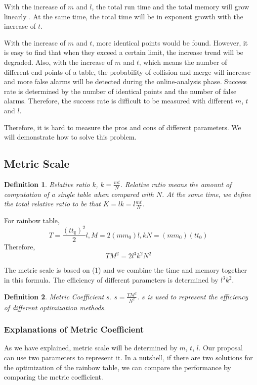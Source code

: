 \documentclass[runningheads,a4paper]{llncs}
\newtheorem{defn}{Definition}
\begin{document}
With the increase of $m$ and $l$, the total run time and the total memory will grow linearly \cite{il1999achieving}. At the same time, the total time will be in exponent growth with the increase of $t$.

With the increase of $m$ and $t$, more identical points would be found. However, it is easy to find that when they exceed a certain limit, the increase trend will be degraded. Also, with the increase of $m$ and $t$, which means the number of different end points of a table, the probability of collision and merge will increase and more false alarms will be detected during the online-analysis phase. Success rate is determined by the number of identical points and the number of false alarms. Therefore, the success rate is difficult to be measured with different $m$, $t$ and $l$.

Therefore, it is hard to measure the pros and cons of different parameters. We will demonstrate how to solve this problem.

\subsection{Metric Scale}

\begin{defn}Relative ratio $k$, $k = \frac{mt}{N}$. Relative ratio means the amount of computation of a single table when compared with $N$. At the same time, we define the total relative ratio to be that $K = lk = l \frac{mt}{N}$.\end{defn}

For rainbow table, 
$$T = \frac{(t t_0)^2}{2} l , M = 2 (m m_0) l, k N = (m m_0) (t t_0)$$
Therefore, 
\begin{equation} 
\label{metric} TM^2 = 2 l^3 k^2 N^2
\end{equation}

The metric scale is based on (1) and we combine the time and memory together in this formula. The efficiency of different parameters is determined by $l^3 k^2$.

\begin{defn} Metric Coefficient $s$. $s = \frac{TM^2}{N^2}$. $s$ is used to represent the efficiency of different optimization methods.\end{defn}

\subsubsection{Explanations of Metric Coefficient} As we have explained, metric scale will be determined by $m$, $t$, $l$. Our proposal can use two parameters to represent it. In a nutshell, if there are two solutions for the optimization of the rainbow table, we can compare the performance by comparing the metric coefficient.
\end{document}
